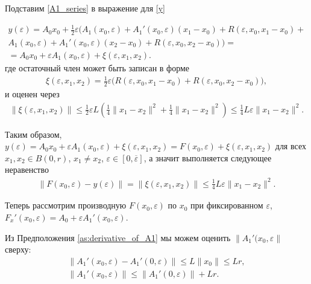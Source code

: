 \documentclass[../main.tex]{subfiles}
\begin{document}
Подставим \eqref{A1_series} в выражение для \eqref{y}

\begin{gather*}
    y(\varepsilon) =
    A_0x_0 +
    \frac{1}{2}\varepsilon \Big(
    A_1(x_0,\varepsilon) +
    A_1'(x_0,\varepsilon)(x_1 - x_0)+ 
    R(\varepsilon, x_0, x_1 - x_0) + \\ 
    A_1(x_0,\varepsilon) +
    A_1'(x_0,\varepsilon)(x_2 - x_0)+ 
    R(\varepsilon, x_0, x_2 - x_0)
    \Big) = \\ = 
    A_0x_0 + 
    \varepsilon A_1(x_0,\varepsilon) +
    \xi(\varepsilon,x_1,x_2).
\end{gather*}
где остаточный член может быть записан в форме
\begin{gather*}
    \xi(\varepsilon,x_1,x_2) = \frac{1}{2}\varepsilon\big(R(\varepsilon, x_0, x_1 - x_0) + R(\varepsilon, x_0, x_2 - x_0)\big),
\end{gather*}
и оценен через
\begin{gather*}
    \|\xi(\varepsilon,x_1,x_2)\| \leqslant \frac{1}{2}\varepsilon L \left(\frac{1}{4}\|x_1 - x_2\|^2 + \frac{1}{4}\|x_1 - x_2\|^2 \right) \leqslant \frac{1}{4}L\varepsilon\|x_1 - x_2\|^2.   
\end{gather*}

Таким образом, $y(\varepsilon) = A_0x_0 + \varepsilon A_1(x_0,\varepsilon) + \xi(\varepsilon,x_1,x_2) = F(x_0,\varepsilon) + \xi(\varepsilon,x_1,x_2)$ для всех $x_1, x_2 \in B(0,r)$, $x_1 \neq x_2$, $\varepsilon \in [0, \overline{\varepsilon}]$, а значит выполняется следующее неравенство
\begin{gather*}
    \| F(x_0,\varepsilon) - y(\varepsilon) \| = \|\xi(\varepsilon,x_1,x_2)\| \leqslant \frac{1}{4}L\varepsilon\|x_1-x_2\|^2.
\end{gather*}


Теперь рассмотрим производную $F(x_0, \varepsilon)$ по $x_0$ при фиксированном $\varepsilon$, $F_x'(x_0,\varepsilon) = A_0 + \varepsilon A_1'(x_0,\varepsilon) $.

Из Предположения \ref{as:derivative_of_A1} мы можем оценить $\|A_1'(x_0,\varepsilon\|$ сверху:
\begin{gather*}
    \|A_1'(x_0,\varepsilon) - A_1'(0,\varepsilon)\| \leqslant 
    L\|x_0\| \leqslant
    L r, \\
    \|A_1'(x_0,\varepsilon)\|  \leqslant \| A_1'(0,\varepsilon)\| + Lr.
\end{gather*}
\end{document}
